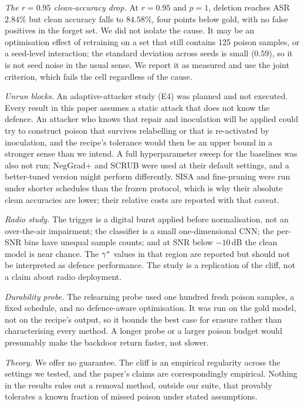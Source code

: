 \emph{The $r{=}0.95$ clean-accuracy drop.} At $r{=}0.95$ and $p{=}1$, deletion
reaches ASR $2.84\%$ but clean accuracy falls to $84.58\%$, four points below
gold, with no false positives in the forget set. We did not isolate the cause. It
may be an optimisation effect of retraining on a set that still contains 125
poison samples, or a seed-level interaction; the standard deviation across seeds
is small ($0.59$), so it is not seed noise in the usual sense. We report it as
measured and use the joint criterion, which fails the cell regardless of the
cause.

\emph{Unrun blocks.} An adaptive-attacker study (E4) was planned and not
executed. Every result in this paper assumes a static attack that does not know
the defence. An attacker who knows that repair and inoculation will be applied
could try to construct poison that survives relabelling or that is re-activated
by inoculation, and the recipe's tolerance would then be an upper bound in a
stronger sense than we intend. A full hyperparameter sweep for the baselines was
also not run; NegGrad+ and SCRUB were used at their default settings, and a
better-tuned version might perform differently. SISA and fine-pruning were run
under shorter schedules than the frozen protocol, which is why their absolute
clean accuracies are lower; their relative costs are reported with that caveat.

\emph{Radio study.} The trigger is a digital burst applied before normalisation,
not an over-the-air impairment; the classifier is a small one-dimensional CNN;
the per-SNR bins have unequal sample counts; and at SNR below $-10$\,dB the clean
model is near chance. The $\gamma^{\ast}$ values in that region are reported but should
not be interpreted as defence performance. The study is a replication of the
cliff, not a claim about radio deployment.

\emph{Durability probe.} The relearning probe used one hundred fresh poison
samples, a fixed schedule, and no defence-aware optimisation. It was run on the
gold model, not on the recipe's output, so it bounds the best case for erasure
rather than characterising every method. A longer probe or a larger poison budget
would presumably make the backdoor return faster, not slower.

\emph{Theory.} We offer no guarantee. The cliff is an empirical regularity across
the settings we tested, and the paper's claims are correspondingly empirical.
Nothing in the results rules out a removal method, outside our suite, that
provably tolerates a known fraction of missed poison under stated assumptions.
